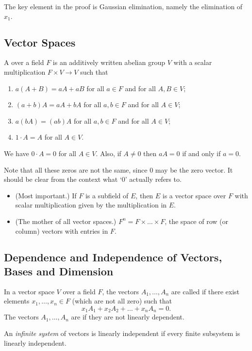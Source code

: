 \begin{remark}
	The key element in the proof is Gaussian elimination, namely the elimination of $x_1$.
\end{remark}

\subsection{Vector Spaces}
\begin{definition}
	A  over a field $F$ is an additively written abelian group $V$ with a scalar multiplication $F \times V \to V$ such that
	\begin{enumerate}
		\item $a(A + B) = aA + aB$ \qquad for all $a \in F$ and for all $A, B \in V$;
		\item $(a + b)A = aA + bA$ \qquad for all $a, b \in F$ and for all $A \in V$;
		\item $a(bA) = (ab)A$ \qquad for all $a, b \in F$ and for all $A \in V$;
		\item $1 \cdot A = A$ \qquad for all $A \in V$.
	\end{enumerate}
\end{definition}

\begin{remark}
	We have $0 \cdot A = 0$ for all $A \in V$. Also, if $A \neq 0$ then $aA = 0$ if and only if $a = 0$.
	
	Note that all these zeros are not the same, since 0 may be the zero vector. It should be clear from the context what `0' actually refers to.
\end{remark}

\begin{examples}\hfill
	\begin{itemize}
		\item (Most important.) If $F$ is a subfield of $E$, then $E$ is a vector space over $F$ with scalar multiplication given by the multiplication in $E$.
		\item (The mother of all vector spaces.) $F^n = F \times \ldots \times F$, the space of row (or column) vectors with entries in $F$.
	\end{itemize}
\end{examples}

\subsection{Dependence and Independence of Vectors, Bases and Dimension}
\begin{definition}
	In a vector space $V$ over a field $F$, the vectors $A_1, \ldots, A_n$ are called  if there exist elements $x_1, \ldots, x_n \in F$ (which are not all zero) such that
	\[
		x_1 A_1 + x_2 A_2 + \ldots + x_n A_n = 0.
	\]
	The vectors $A_1, \ldots, A_n$ are  if they are not linearly dependent.
	
	An \emph{infinite system} of vectors is linearly independent if every finite subsystem is linearly independent.
\end{definition}


